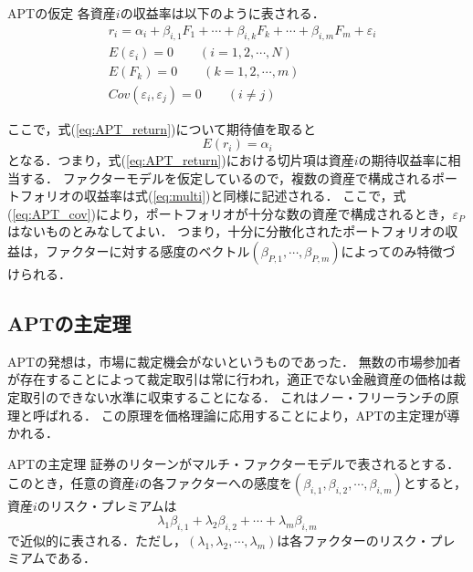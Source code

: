 \documentclass[11pt]{jreport}
\begin{document}
\begin{itembox}[l]{APTの仮定}
各資産$i$の収益率は以下のように表される．
\begin{eqnarray}
& r_i = \alpha_i + \beta_{i,1}F_1 + \cdots + \beta_{i,k}F_k + \cdots + \beta_{i,m}F_m + \varepsilon_i\label{eq:APT_return} \\
& E(\varepsilon_i) = 0 \qquad (i=1,2,\cdots,N)\\
& E(F_k) = 0 \qquad (k=1,2,\cdots,m)\\
& Cov(\varepsilon_i, \varepsilon_j) = 0 \qquad (i \neq j) \label{eq:APT_cov}
\end{eqnarray}
\end{itembox}
ここで，式(\ref{eq:APT_return})について期待値を取ると
\begin{equation}
E(r_i) = \alpha_i
\end{equation}
となる．つまり，式(\ref{eq:APT_return})における切片項は資産$i$の期待収益率に相当する．
ファクターモデルを仮定しているので，複数の資産で構成されるポートフォリオの収益率は式(\ref{eq:multi})と同様に記述される．
ここで，式(\ref{eq:APT_cov})により，ポートフォリオが十分な数の資産で構成されるとき，$\varepsilon_P$はないものとみなしてよい．
つまり，十分に分散化されたポートフォリオの収益は，ファクターに対する感度のベクトル$(\beta_{P,1},\cdots,\beta_{P,m})$によってのみ特徴づけられる．




\subsection{APTの主定理}
APTの発想は，市場に裁定機会がないというものであった．
無数の市場参加者が存在することによって裁定取引は常に行われ，適正でない金融資産の価格は裁定取引のできない水準に収束することになる．
これはノー・フリーランチの原理と呼ばれる．
この原理を価格理論に応用することにより，APTの主定理が導かれる．

\begin{itembox}[l]{APTの主定理}
証券のリターンがマルチ・ファクターモデルで表されるとする．
このとき，任意の資産$i$の各ファクターへの感度を$(\beta_{i,1},\beta_{i,2},\cdots,\beta_{i,m})$とすると，資産$i$のリスク・プレミアムは
\begin{equation}
\lambda_1\beta_{i,1} + \lambda_2\beta_{i,2} + \cdots + \lambda_m\beta_{i,m}
\end{equation}
で近似的に表される．ただし，$( \lambda_1, \lambda_2, \cdots ,\lambda_m )$は各ファクターのリスク・プレミアムである．
\end{itembox}
\end{document}
